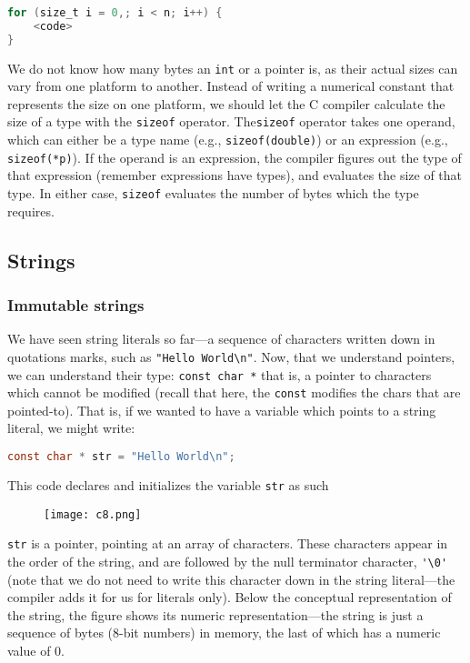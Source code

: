 \documentclass[12pt,a4paper]{article}
\begin{document}
\begin{lstlisting}[language=C]
for (size_t i = 0,; i < n; i++) {
	<code>
}
\end{lstlisting}

We do not know how many bytes an \verb|int| or a pointer is, as their actual
sizes can vary from one platform to another. Instead of writing a numerical
constant that represents the size on one platform, we should let the C compiler
calculate the size of a type with the \verb|sizeof| operator. The\verb|sizeof|
operator takes one operand, which can either be a type name (e.g.,
\verb|sizeof(double)|) or an expression (e.g.,\verb| sizeof(*p)|). If the
operand is an expression, the compiler figures out the type of that expression
(remember expressions have types), and evaluates the size of that type. In
either case, \verb|sizeof| evaluates the number of bytes which the type
requires.

\subsection{Strings}

\subsubsection{Immutable strings}

We have seen string literals so far—a sequence of characters written down in
quotations marks, such as \verb|"Hello World\n"|.  Now, that we understand
pointers, we can understand their type: \verb|const char *| that is, a pointer
to characters which cannot be modified (recall that here, the \verb|const|
modifies the chars that are pointed-to).  That is, if we wanted to have a
variable which points to a string literal, we might write:

\begin{lstlisting}[language=C]
const char * str = "Hello World\n";
\end{lstlisting}

This code declares and initializes the variable \verb|str| as such
\begin{figure}[!htbp]
	\centering
	\texttt{[image: c8.png]}
\end{figure}

\verb|str| is a pointer, pointing at an array of characters. These characters
appear in the order of the string, and are followed by the null terminator
character, \verb|'\0'| (note that we do not need to write this character down
in the string literal—the compiler adds it for us for literals only). Below the
conceptual representation of the string, the figure shows its numeric
representation—the string is just a sequence of bytes (8-bit numbers) in
memory, the last of which has a numeric value of 0.
\end{document}
